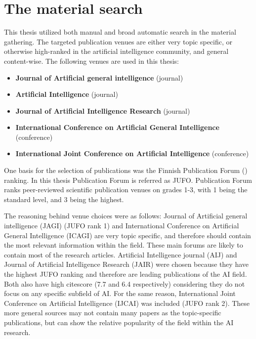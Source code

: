 \documentclass[utf8,english]{gradu3}
\begin{document}
\section{The material search}

This thesis utilized both manual and broad automatic search in the material
gathering. The targeted publication venues are either very topic specific, or
otherwise high-ranked in the artificial intelligence community, and general
content-wise. The following venues are used in this thesis:

\begin{itemize}
  \item \textbf{Journal of Artificial general intelligence} (journal)
  \item \textbf{Artificial Intelligence} (journal)
  \item \textbf{Journal of Artificial Intelligence Research} (journal)
  \item \textbf{International Conference on Artificial General Intelligence}
  (conference)
  \item \textbf{International Joint Conference on Artificial Intelligence}
  (conference)
\end{itemize}

One basis for the selection of publications was the Finnish Publication Forum
(\cite{jufo}) ranking. In this thesis Publication Forum is referred as JUFO.
Publication Forum ranks peer-reviewed scientific publication venues on grades
1-3, with 1 being the standard level, and 3 being the highest.

The reasoning behind venue choices were as follows: Journal of Artificial
general intelligence (JAGI) (JUFO rank 1) and International Conference on
Artificial General Intelligence (ICAGI) are very topic specific, and therefore
should contain the most relevant information within the field. These main forums
are likely to contain most of the research articles. Artificial Intelligence
journal (AIJ) and Journal of Artificial Intelligence Research (JAIR) were chosen
because they have the highest JUFO ranking and therefore are leading
publications of the AI field. Both also have high citescore (7.7 and 6.4
respectively) considering they do not focus on any specific subfield of AI. For
the same reason, International Joint Conference on Artificial Intelligence
(IJCAI) was included (JUFO rank 2). These more general sources may not contain
many papers as the topic-specific publications, but can show the relative
popularity of the field within the AI research.
\end{document}
